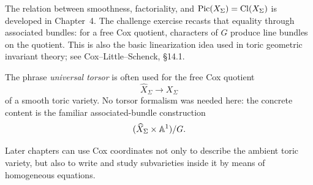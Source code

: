 The relation between smoothness, factoriality, and
\(\operatorname{Pic}(X_\Sigma)=\operatorname{Cl}(X_\Sigma)\) is developed in Chapter~4. The
challenge exercise recasts that equality through associated bundles:
for a free Cox quotient, characters of \(G\) produce line bundles on
the quotient. This is also the basic linearization idea used in toric
geometric invariant theory; see Cox--Little--Schenck, \S14.1.

The phrase \emph{universal torsor} is often used for the free Cox
quotient
\[
\widehat X_\Sigma\longrightarrow X_\Sigma
\]
of a smooth toric variety. No torsor formalism was needed here: the
concrete content is the familiar associated-bundle construction
\[
(\widehat X_\Sigma\times\mathbb{A}^1)/G.
\]

Later chapters can use Cox coordinates not only to describe the
ambient toric variety, but also to write and study subvarieties inside
it by means of homogeneous equations.
